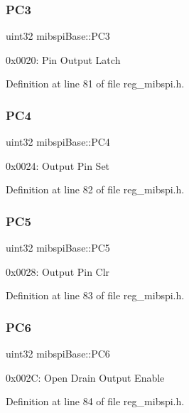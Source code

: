 \subsubsection{\texorpdfstring{P\+C3}{PC3}}
{\footnotesize\ttfamily uint32 mibspi\+Base\+::\+P\+C3}

0x0020\+: Pin Output Latch 

Definition at line 81 of file reg\+\_\+mibspi.\+h.

\mbox{\label{structmibspiBase_a9da5db31af2ba200c4b7933571b79379}} 
\subsubsection{\texorpdfstring{P\+C4}{PC4}}
{\footnotesize\ttfamily uint32 mibspi\+Base\+::\+P\+C4}

0x0024\+: Output Pin Set 

Definition at line 82 of file reg\+\_\+mibspi.\+h.

\mbox{\label{structmibspiBase_a24a90e671736eb1a7053f4d10b4fbda6}} 
\subsubsection{\texorpdfstring{P\+C5}{PC5}}
{\footnotesize\ttfamily uint32 mibspi\+Base\+::\+P\+C5}

0x0028\+: Output Pin Clr 

Definition at line 83 of file reg\+\_\+mibspi.\+h.

\mbox{\label{structmibspiBase_a3a433344e81efd566c9bbad9e7e5aa5c}} 
\subsubsection{\texorpdfstring{P\+C6}{PC6}}
{\footnotesize\ttfamily uint32 mibspi\+Base\+::\+P\+C6}

0x002C\+: Open Drain Output Enable 

Definition at line 84 of file reg\+\_\+mibspi.\+h.

\mbox{\label{structmibspiBase_ad6774736af035f04f4765fc571dec311}} 
